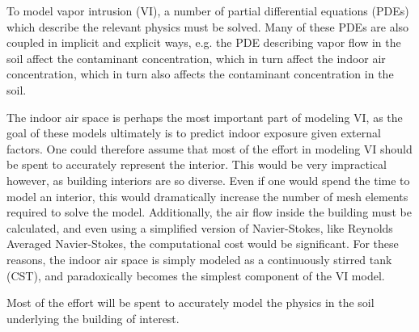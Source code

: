 To model vapor intrusion (VI), a number of partial differential equations (PDEs) which describe the relevant physics must be solved.
Many of these PDEs are also coupled in implicit and explicit ways, e.g. the PDE describing vapor flow in the soil affect the contaminant concentration, which in turn affect the indoor air concentration, which in turn also affects the contaminant concentration in the soil. 


The indoor air space is perhaps the most important part of modeling VI, as the goal of these models ultimately is to predict indoor exposure given external factors.
One could therefore assume that most of the effort in modeling VI should be spent to accurately represent the interior.
This would be very impractical however, as building interiors are so diverse.
Even if one would spend the time to model an interior, this would dramatically increase the number of mesh elements required to solve the model.
Additionally, the air flow inside the building must be calculated, and even using a simplified version of Navier-Stokes, like Reynolds Averaged Navier-Stokes, the computational cost would be significant.
For these reasons, the indoor air space is simply modeled as a continuously stirred tank (CST), and paradoxically becomes the simplest component of the VI model.\par

Most of the effort will be spent to accurately model the physics in the soil underlying the building of interest.
